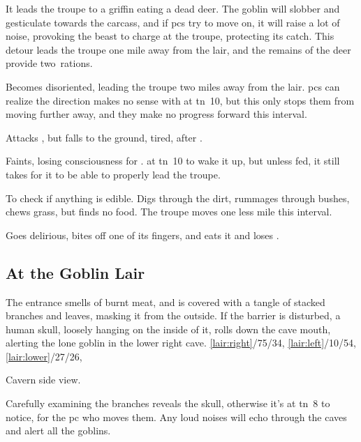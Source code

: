 \documentclass[10pt,twoside]{book}
\begin{document}
\begin{dlist}
  \item
  It leads the troupe to a griffin eating a dead deer.
  The goblin will slobber and gesticulate towards the carcass, and if \glspl{pc} try to move on, it will raise a lot of noise, provoking the beast to charge at the troupe, protecting its catch.
  This detour leads the troupe one mile away from the lair, and the remains of the deer provide two~\glspl{ration}.
  \item
  Becomes disoriented, leading the troupe two miles away from the lair.
  \glspl{pc} can realize the direction makes no sense with  at \gls{tn}~10, but this only stops them from moving further away, and they make no progress forward this \gls{interval}.
  \item
  Attacks , but falls to the ground, tired, after .
  \item
  Faints, losing consciousness for .
   at \gls{tn}~10 to wake it up, but unless fed, it still takes  for it to be able to properly lead the troupe.
  \item
  To check if anything is edible.
  Digs through the dirt, rummages through bushes, chews grass, but finds no food.
  The troupe moves one less mile this \gls{interval}.
  \item
  Goes delirious, bites off one of its fingers, and eats it and loses .
\end{dlist}

\subsection{At the Goblin Lair}
The entrance smells of burnt meat, and is covered with a tangle of stacked branches and leaves, masking it from the outside.
If the barrier is disturbed, a human skull, loosely hanging on the inside of it, rolls down the cave mouth, alerting the lone goblin in the lower right cave.
%
  {%
    \ref{lair:right}/75/34,
    \ref{lair:left}/10/54,
    \ref{lair:lower}/27/26,
  }%
{Cavern side view.\par\null}

Carefully examining the branches reveals the skull, otherwise it's  at \gls{tn}~8 to notice, for the \gls{pc} who moves them.
Any loud noises will echo through the caves and alert all the goblins.

\goblin
\end{document}
